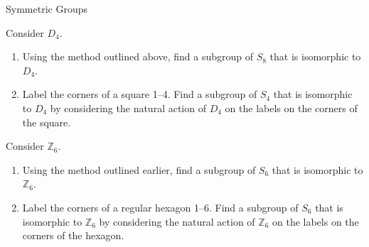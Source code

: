 \begin{section}{Symmetric Groups}
\begin{problem}
Consider $D_4$.
\begin{enumerate}[label=\textrm{(\alph*)}]
\item Using the method outlined above, find a subgroup of $S_8$ that is isomorphic to $D_4$.
\item Label the corners of a square 1--4. Find a subgroup of $S_4$ that is isomorphic to $D_4$ by considering the natural action of $D_4$ on the labels on the corners of the square.
\end{enumerate}
\end{problem}

\begin{problem}
Consider $\mathbb{Z}_6$.
\begin{enumerate}[label=\textrm{(\alph*)}]
\item Using the method outlined earlier, find a subgroup of $S_6$ that is isomorphic to $\mathbb{Z}_6$.
\item Label the corners of a regular hexagon 1--6. Find a subgroup of $S_6$ that is isomorphic to $\mathbb{Z}_6$ by considering the natural action of $\mathbb{Z}_6$ on the labels on the corners of the hexagon.
\end{enumerate}
\end{problem}

\end{section}

